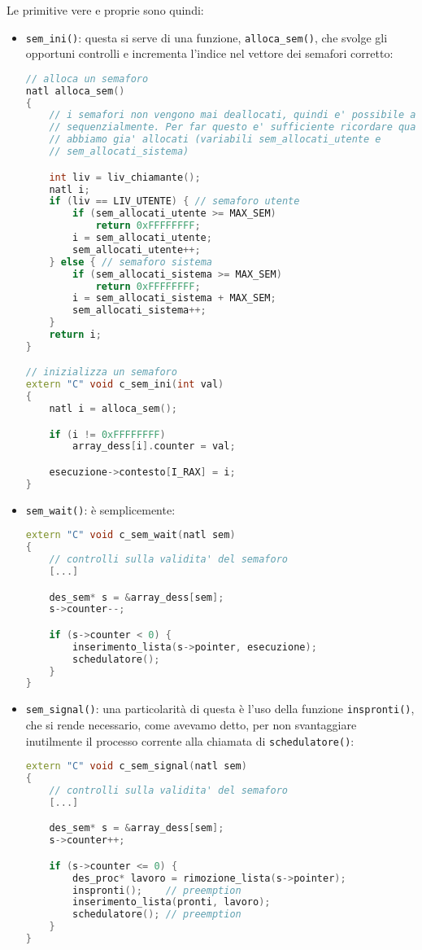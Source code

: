 \documentclass[a4paper,11pt]{article}
\begin{document}
Le primitive vere e proprie sono quindi:
\begin{itemize}
	\item \lstinline|sem_ini()|: questa si serve di una funzione, \lstinline|alloca_sem()|, che svolge gli opportuni controlli e incrementa l'indice nel vettore dei semafori corretto:
\begin{lstlisting}[language=C++, style=codestyle]
// alloca un semaforo
natl alloca_sem()
{
	// i semafori non vengono mai deallocati, quindi e' possibile allocarli
	// sequenzialmente. Per far questo e' sufficiente ricordare quanti ne
	// abbiamo gia' allocati (variabili sem_allocati_utente e
	// sem_allocati_sistema)

	int liv = liv_chiamante();
	natl i;
	if (liv == LIV_UTENTE) { // semaforo utente
		if (sem_allocati_utente >= MAX_SEM)
			return 0xFFFFFFFF;
		i = sem_allocati_utente;
		sem_allocati_utente++;
	} else { // semaforo sistema
		if (sem_allocati_sistema >= MAX_SEM)
			return 0xFFFFFFFF;
		i = sem_allocati_sistema + MAX_SEM;
		sem_allocati_sistema++;
	}
	return i;
}

// inizializza un semaforo
extern "C" void c_sem_ini(int val)
{
	natl i = alloca_sem();

	if (i != 0xFFFFFFFF)
		array_dess[i].counter = val;

	esecuzione->contesto[I_RAX] = i;
}
\end{lstlisting}
	\item \lstinline|sem_wait()|: è semplicemente:
\begin{lstlisting}[language=C++, style=codestyle]	
extern "C" void c_sem_wait(natl sem)
{
	// controlli sulla validita' del semaforo
	[...]

	des_sem* s = &array_dess[sem];
	s->counter--;

	if (s->counter < 0) {
		inserimento_lista(s->pointer, esecuzione);
		schedulatore();
	}
}
\end{lstlisting}
	\item \lstinline|sem_signal()|: una particolarità di questa è l'uso della funzione \lstinline|inspronti()|, che si rende necessario, come avevamo detto, per non svantaggiare inutilmente il processo corrente alla chiamata di \lstinline|schedulatore()|:
\begin{lstlisting}[language=C++, style=codestyle]	
extern "C" void c_sem_signal(natl sem)
{
	// controlli sulla validita' del semaforo
	[...]

	des_sem* s = &array_dess[sem];
	s->counter++;

	if (s->counter <= 0) {
		des_proc* lavoro = rimozione_lista(s->pointer);
		inspronti();	// preemption
		inserimento_lista(pronti, lavoro);
		schedulatore();	// preemption
	}
}
\end{lstlisting}
\end{itemize}
\end{document}

